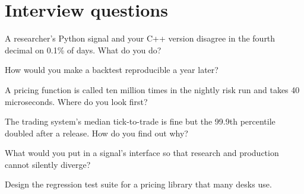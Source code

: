 \section{Interview questions}

\begin{interviewq}\label{iq:in:quant-developer:1}
A researcher's Python signal and your C++ version disagree in the fourth decimal on 0.1\% of days. What do you do?
\end{interviewq}

\begin{interviewq}\label{iq:in:quant-developer:2}
How would you make a backtest reproducible a year later?
\end{interviewq}

\begin{interviewq}\label{iq:in:quant-developer:3}
A pricing function is called ten million times in the nightly risk run and takes 40 microseconds. Where do you look first?
\end{interviewq}

\begin{interviewq}\label{iq:in:quant-developer:4}
The trading system's median tick-to-trade is fine but the 99.9th percentile doubled after a release. How do you find
out why?
\end{interviewq}

\begin{interviewq}\label{iq:in:quant-developer:5}
What would you put in a signal's interface so that research and production cannot silently diverge?
\end{interviewq}

\begin{interviewq}\label{iq:in:quant-developer:6}
Design the regression test suite for a pricing library that many desks use.
\end{interviewq}

